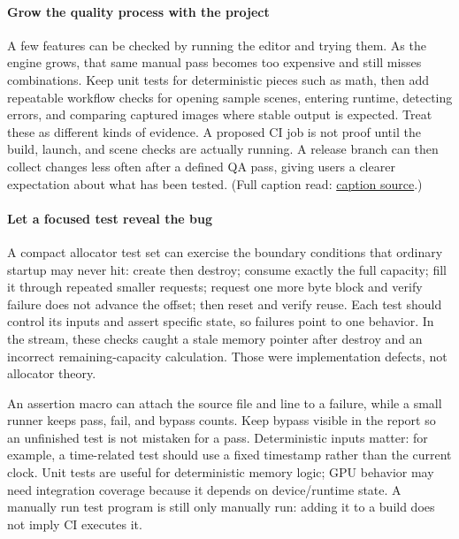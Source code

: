 \paragraph{Grow the quality process with the project}\label{grow-the-quality-process-with-the-project}

A few features can be checked by running the editor and trying them. As the engine grows, that same manual pass becomes too expensive and still misses combinations. Keep unit tests for deterministic pieces such as math, then add repeatable workflow checks for opening sample scenes, entering runtime, detecting errors, and comparing captured images where stable output is expected. Treat these as different kinds of evidence. A proposed CI job is not proof until the build, launch, and scene checks are actually running. A release branch can then collect changes less often after a defined QA pass, giving users a clearer expectation about what has been tested. (Full caption read: \href{https://www.youtube.com/watch?v=tHjJHmDxhug}{caption source}.)

\paragraph{Let a focused test reveal the bug}\label{let-a-focused-test-reveal-the-bug}

A compact allocator test set can exercise the boundary conditions that ordinary startup may never hit: create then destroy; consume exactly the full capacity; fill it through repeated smaller requests; request one more byte block and verify failure does not advance the offset; then reset and verify reuse. Each test should control its inputs and assert specific state, so failures point to one behavior. In the stream, these checks caught a stale memory pointer after destroy and an incorrect remaining-capacity calculation. Those were implementation defects, not allocator theory.

An assertion macro can attach the source file and line to a failure, while a small runner keeps pass, fail, and bypass counts. Keep bypass visible in the report so an unfinished test is not mistaken for a pass. Deterministic inputs matter: for example, a time-related test should use a fixed timestamp rather than the current clock. Unit tests are useful for deterministic memory logic; GPU behavior may need integration coverage because it depends on device/runtime state. A manually run test program is still only manually run: adding it to a build does not imply CI executes it.

